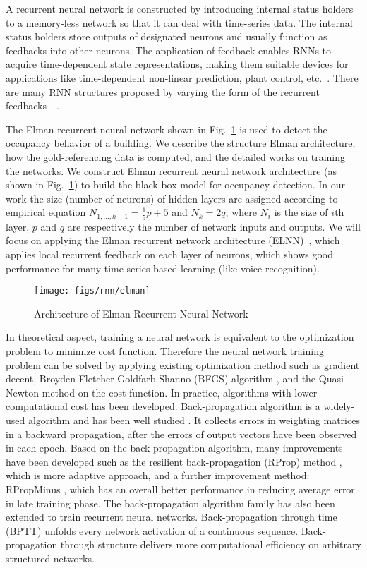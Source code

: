A recurrent neural network is constructed by introducing
internal status holders to a memory-less network so that it can deal
with time-series data. The internal status holders store outputs of
designated neurons and usually function as feedbacks into other
neurons. The application of feedback enables RNNs to acquire
time-dependent state representations, making them suitable devices for
applications like time-dependent non-linear prediction, plant control,
etc.~\cite{haykin2004compreh}. There are many RNN structures
proposed by varying the form of the recurrent
feedbacks~~\cite{elman1990finding,haykin2004compreh,puskorius1996dynamic}.

\textcolor{feb18rev}{The Elman recurrent neural network shown in
Fig.~\ref{fig:elman} is used to detect the occupancy behavior of a building.}
We describe the structure Elman architecture, how the gold-referencing data is
computed, and the detailed works on training the networks. We construct Elman recurrent neural network architecture (as shown in Fig.~\ref{fig:elman}) to build the black-box model for occupancy detection. In
our work the size (number of neurons) of hidden layers are assigned according
to empirical equation $N_{1,\ldots,k-1}=\frac15p+5$ and $N_k=2q$, where $N_i$
is the size of $i$th layer, $p$ and $q$ are respectively the number of network
inputs and outputs. We will focus on applying the Elman recurrent network
architecture (ELNN)~\cite{elman1990finding}, which applies local
recurrent feedback on each layer of neurons, which shows good
performance for many time-series based learning (like voice
recognition).

\begin{figure}[t]
    \centering
    \texttt{[image: figs/rnn/elman]}
    \caption{Architecture of Elman Recurrent Neural Network}
    \label{fig:elman}
\end{figure}


In theoretical aspect, training a neural network is equivalent to the optimization problem to minimize cost function. Therefore the neural network training problem can be solved by applying existing optimization method such as gradient decent, Broyden-Fletcher-Goldfarb-Shanno (BFGS) algorithm
\cite{heath2010sci}, and the Quasi-Newton method on the cost function. In practice, algorithms with lower computational cost has been developed. Back-propagation algorithm is a widely-used algorithm and has been well studied \cite{hecht1988backprop}. It collects errors in weighting matrices in a backward propagation, after the errors of output vectors have been observed in each epoch. Based on the back-propagation algorithm, many improvements have been developed such as the resilient back-propagation (RProp) method \cite{riedmiller1993direct}, which is more adaptive approach, and a further improvement method: RPropMinus \cite{igel2003empirical}, which has an overall better performance in reducing average error in late training phase. The back-propagation algorithm family has also been extended to train recurrent neural networks. Back-propagation through time (BPTT) \cite{werbos1990backprop} unfolds every network activation of a
continuous sequence. Back-propagation through structure delivers more computational efficiency on
arbitrary structured networks.
